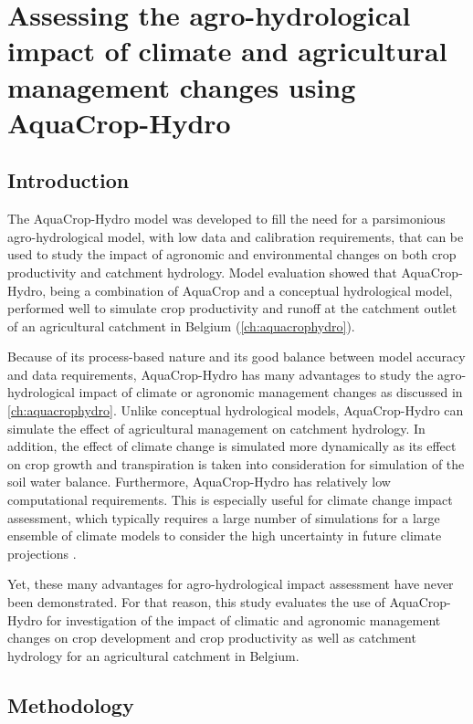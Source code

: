 \chapter{Assessing the agro-hydrological impact of climate and agricultural management changes using AquaCrop-Hydro}\label{ch:achtoep}

\section{Introduction}
The AquaCrop-Hydro model was developed to fill the need for a parsimonious agro-hydrological model, with low data and calibration requirements, that can be used to study the impact of agronomic and environmental changes on both crop productivity and catchment hydrology. Model evaluation showed that AquaCrop-Hydro, being a combination of AquaCrop and a conceptual hydrological model, performed well to simulate crop productivity and runoff at the catchment outlet of an agricultural catchment in Belgium (\autoref{ch:aquacrophydro}). 

Because of its process-based nature and its good balance between model accuracy and data requirements, AquaCrop-Hydro has many advantages to study the agro-hydrological impact of climate or agronomic management changes as discussed in \autoref{ch:aquacrophydro}.  Unlike conceptual hydrological models, AquaCrop-Hydro can simulate the effect of agricultural management on catchment hydrology. In addition, the effect of climate change is simulated more dynamically as its effect on crop growth and transpiration is taken into consideration for simulation of the soil water balance. Furthermore, AquaCrop-Hydro has relatively low computational requirements. This is especially useful for climate change impact assessment, which  typically requires a large number of simulations for a large ensemble of climate models to consider the high uncertainty in future climate projections \parencite{collins2007}. 

Yet, these many advantages for agro-hydrological impact assessment have never been demonstrated. For that reason, this study evaluates the use of AquaCrop-Hydro for investigation of the impact of climatic and agronomic management changes on crop development and crop productivity as well as catchment hydrology for an agricultural catchment in Belgium.

\section{Methodology}
